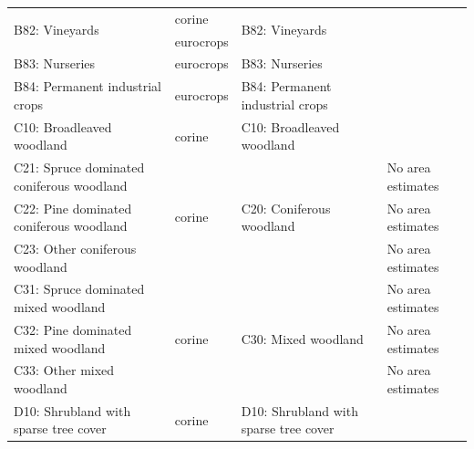 \begin{table}[]
\begin{tabular}{l{2cm}lll}
\multirow{2}{*}{B82: Vineyards}               & corine                  & \multirow{2}{*}{B82: Vineyards}                       &                                                           \\
                                              & eurocrops               &                                                       &                                                           \\
B83: Nurseries                                & eurocrops               & B83: Nurseries                                        &                                                           \\
B84: Permanent industrial crops               & eurocrops               & B84: Permanent industrial crops                       &                                                           \\
C10: Broadleaved woodland                     & corine                  & C10: Broadleaved woodland                             &                                                           \\
C21: Spruce dominated coniferous woodland     & \multirow{3}{*}{corine} & \multirow{3}{*}{C20: Coniferous woodland}             & No area estimates                                         \\
C22: Pine dominated coniferous woodland       &                         &                                                       & No area estimates                                         \\
C23: Other coniferous woodland                &                         &                                                       & No area estimates                                         \\
C31: Spruce dominated mixed woodland          & \multirow{3}{*}{corine} & \multirow{3}{*}{C30: Mixed woodland}                  & No area estimates                                         \\
C32: Pine dominated mixed woodland            &                         &                                                       & No area estimates                                         \\
C33: Other mixed woodland                     &                         &                                                       & No area estimates                                         \\
D10: Shrubland with sparse tree cover         & corine                  & D10: Shrubland with sparse tree cover                 &                                                           \\

\end{tabular}
\end{table}
